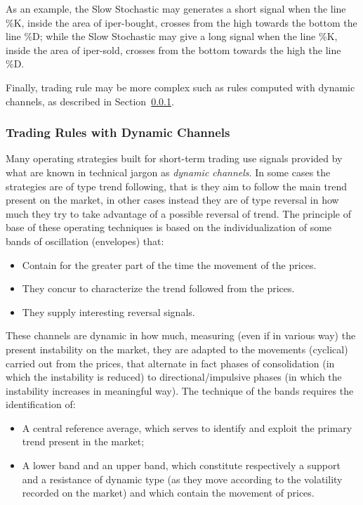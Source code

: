\noindent As an example, the Slow Stochastic may generates a short signal when the line \%K, inside the area of iper-bought, crosses from the high towards the bottom the line \%D; while the Slow Stochastic may give a long signal when the line \%K, inside the area of iper-sold, crosses from the bottom towards the high the line \%D.

Finally, trading rule may be more complex such as rules computed with dynamic channels, as described in Section~\ref{sec:dynCha}.


\subsubsection{Trading Rules with Dynamic Channels}
\label{sec:dynCha}
Many operating strategies built for short-term trading use signals provided by what are known in technical jargon as \textit{dynamic channels}. In some cases the strategies are of type trend following, that is they aim to follow the main trend present on the market, in other cases instead they are of type reversal in how much they try to take advantage of a possible reversal of trend.
The principle of base of these operating techniques is based on the individualization of some bands of oscillation (envelopes) that:

\begin{itemize}
\setlength\itemsep{0.3em}
\item Contain for the greater part of the time the movement of the prices.
\item They concur to characterize the trend followed from the prices.
\item They supply interesting reversal signals.
\end{itemize}

These channels are dynamic in how much, measuring (even if in various way) the present instability on the market, they are adapted to the movements (cyclical) carried out from the prices, that alternate in fact phases of consolidation (in which the instability is reduced) to directional/impulsive phases (in which the instability increases in meaningful way). The technique of the bands requires the identification of:

\begin{itemize}
\setlength\itemsep{0.3em}
\item A central reference average, which serves to identify and exploit the primary trend present in the market;
\item A lower band and an upper band, which constitute respectively a support and a resistance of dynamic type (as they move according to the volatility recorded on the market) and which contain the movement of prices.
\end{itemize}

